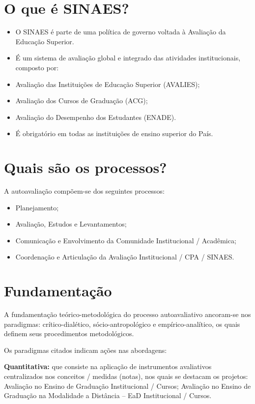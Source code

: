 \documentclass[final]{beamer}
\begin{document}
\begin{poster}
\section{O que é SINAES?}
\begin{itemize}
	\item O SINAES é parte de uma política de governo voltada à Avaliação da Educação Superior.
	\item É um sistema de avaliação global e integrado das atividades institucionais, composto por:
	\item Avaliação das Instituições de Educação Superior (AVALIES); 
	\item Avaliação dos Cursos de Graduação (ACG); 
	\item Avaliação do Desempenho dos Estudantes (ENADE). 
	\item É obrigatório em todas as instituições de ensino superior do País.
\end{itemize}

\section{Quais são os processos?}
A autoavaliação compõem-se dos seguintes processos:
\begin{itemize}
	\item Planejamento;
	\item Avaliação, Estudos e Levantamentos;
	\item Comunicação e Envolvimento da Comunidade Institucional / Acadêmica;
	\item Coordenação e Articulação da Avaliação Institucional / CPA / SINAES.
\end{itemize}



\newcolumn

\section{Fundamentação}
A fundamentação teórico-metodológica do processo autoavaliativo ancoram-se nos paradigmas: crítico-dialético, sócio-antropológico e empírico-analítico, os quais definem seus procedimentos metodológicos.

Os paradigmas citados indicam ações nas abordagens:

\textbf{Quantitativa:} que consiste na aplicação de instrumentos avaliativos centralizados nos conceitos / medidas (notas), nos quais se destacam os projetos:
Avaliação no Ensino de Graduação Institucional / Cursos; 
Avaliação no Ensino de Graduação na Modalidade a Distância – EaD Institucional / Cursos. 


\end{poster}
\end{document}
